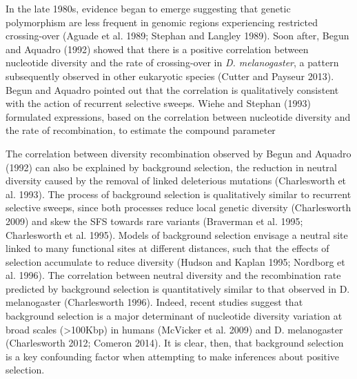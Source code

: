 In the late 1980s, evidence began to emerge suggesting that genetic polymorphism are less frequent in genomic regions experiencing restricted crossing-over (Aguade et al. 1989; Stephan and Langley 1989). Soon after, Begun and Aquadro (1992) showed that there is a positive correlation between nucleotide diversity and the rate of crossing-over in \emph{D. melanogaster}, a pattern subsequently observed in other eukaryotic species (Cutter and Payseur 2013). Begun and Aquadro pointed out that the correlation is qualitatively consistent with the action of recurrent selective sweeps. Wiehe and Stephan (1993) formulated expressions, based on the correlation between nucleotide diversity and the rate of recombination, to estimate the compound parameter%
 
The correlation between diversity recombination observed by Begun and Aquadro (1992) can also be explained by background selection, the reduction in neutral diversity caused by the removal of linked deleterious mutations (Charlesworth et al. 1993). The process of background selection is qualitatively similar to recurrent selective sweeps, since both processes reduce local genetic diversity (Charlesworth 2009) and skew the SFS towards rare variants (Braverman et al. 1995; Charlesworth et al. 1995). Models of background selection envisage a neutral site linked to many functional sites at different distances, such that the effects of selection accumulate to reduce diversity (Hudson and Kaplan 1995; Nordborg et al. 1996). The correlation between neutral diversity and the recombination rate predicted by background selection is quantitatively similar to that observed in D. melanogaster (Charlesworth 1996). Indeed, recent studies suggest that background selection is a major determinant of nucleotide diversity variation at broad scales (>100Kbp) in humans (McVicker et al. 2009) and D. melanogaster (Charlesworth 2012; Comeron 2014). It is clear, then, that background selection is a key confounding factor when attempting to make inferences about positive selection.
 
